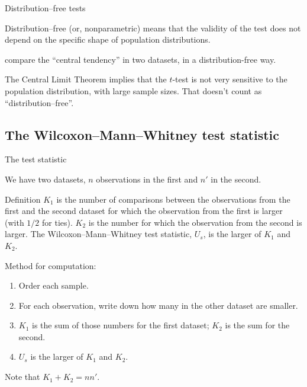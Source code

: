 \begin{frame}{Distribution--free tests}
  \begin{block}{Distribution--free (or, nonparametric)}
    means that the validity of the test does not depend on the specific shape of population distributions.
  \end{block}

    \vspace{2em}

     compare the ``central tendency'' in two datasets,
    in a distribution-free way.

    \vspace{3em}

     The Central Limit Theorem implies that the $t$-test is not very sensitive to the population distribution, with large sample sizes.  That doesn't count as ``distribution--free''.

\end{frame}

\subsection{The Wilcoxon--Mann--Whitney test statistic}

\begin{frame}{The test statistic}

    We have two datasets, %
    $n$ observations in the first and $n'$ in the second.

  \begin{block}{Definition}
    $K_1$ is the number of comparisons between the observations from the first and the second dataset for which the observation from the first is larger (with $1/2$ for ties). 
    $K_2$ is the number for which the observation from the second is larger.
    The Wilcoxon--Mann--Whitney test statistic, $U_s$, 
    is the larger of $K_1$ and $K_2$.
  \end{block}


    \vspace{1em}

    Method for computation:
    \begin{enumerate}
      \item Order each sample.
      \item For each observation, write down how many in the other dataset are smaller.
      \item $K_1$ is the sum of those numbers for the first dataset; $K_2$ is the sum for the second.
      \item $U_s$ is the larger of $K_1$ and $K_2$.
    \end{enumerate}

    \vspace{1em}

    Note that $K_1 + K_2 = n n'$.

\end{frame}

